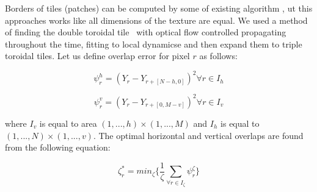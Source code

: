 	Borders of tiles (patches) can be computed by some of existing algorithm 
	\cite{Boykov01fastapproximate,ExactMinBinarying,Kwatra03graphcuttextures}, ut this approaches works like all dimensions of the texture are equal. We used a method of finding the double toroidal tile~\cite{HaiHat05} with optical flow controlled propagating throughout the time, fitting to local dynamicse and then expand them to triple toroidal tiles.
	Let us define overlap error for pixel $r$ as follows:

	\begin{equation} \label{eq:h_overlap}
		 \psi_{r}^h = (Y_{r} - Y_{r+[N-h,0]})^2       \forall r \in I_h 
	\end{equation} 

	\begin{equation} \label{eq:v_overlap}
		 \psi_{r}^v = (Y_{r} - Y_{r+[0,M-v]})^2       \forall r \in I_v 
	\end{equation} 

	where $I_{v}$ is equal to area $(1,...,h) \times (1,...,M)$  and $I_{h}$ is equal to $(1,...,N) \times (1,...,v)$.
	The optimal horizontal and vertical overlaps are found from the following equation:

	\begin{equation} \label{eq:optimal_overlap}
		 \zeta_{r}^* = min_{\zeta} \{ \frac{1}{\zeta}\sum_{\forall r \in I_{\zeta}}{\psi_r^{\zeta}}\} 
	\end{equation}
						






